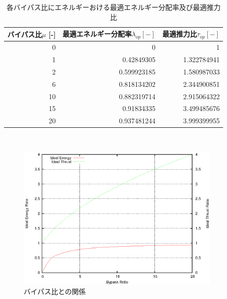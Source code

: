 \begin{table}[htb]
 \begin{center}
  \caption{各バイパス比にエネルギーおける最適エネルギー分配率及び最適推力比}
  \begin{tabular}{|r|r|r|} \hline
  バイパス比$\mu$ [-] & 最適エネルギー分配率$\lambda_{op} [-] $ & 最適推力比$\tau_{op}[-]$   \\ \hline
  0  & 0            &  1            \\ \hline
  1  & 0.42849305   &  1.322784941  \\ \hline
  2  & 0.599923185  &  1.580987033  \\ \hline
  6  & 0.818134202  &  2.344900851  \\ \hline
  10 & 0.882319714  &  2.915064322  \\ \hline
  15 & 0.91834335   &  3.499485676  \\ \hline
  20 & 0.937481244  &  3.999399955  \\ \hline
  \end{tabular}
 \end{center}
\end{table}
\\
\begin{figure}[t]
 \begin{center}
  \includegraphics[width=10.0cm]{eps/body1_1.eps}
  \caption{バイパス比との関係}
 \end{center}
\end{figure}

\\

